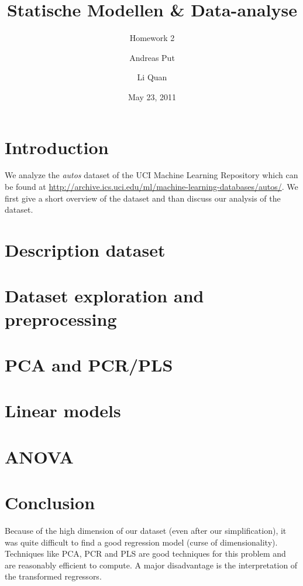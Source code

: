 \documentclass[a4paper,english,11pt,]{scrartcl}
\title{Statische Modellen \& Data-analyse}
\subtitle{Homework 2}
\author{Andreas Put \and Li Quan}
\date{May 23, 2011}
\begin{document}
\maketitle

\section{Introduction}
We analyze the \emph{autos} dataset of the UCI Machine Learning Repository which can be found at \url{http://archive.ics.uci.edu/ml/machine-learning-databases/autos/}.
We first give a short overview of the dataset and than discuss our analysis of the dataset.

\section{Description dataset}


\section{Dataset exploration and preprocessing}


\section{PCA and PCR/PLS}


\section{Linear models}


\section{ANOVA}


\section{Conclusion}
Because of the high dimension of our dataset (even after our simplification), it was quite difficult to find a good regression model (curse of dimensionality). Techniques like PCA, PCR and PLS are good techniques for this problem and are reasonably efficient to compute. A major disadvantage is the interpretation of the transformed regressors.
\end{document}
